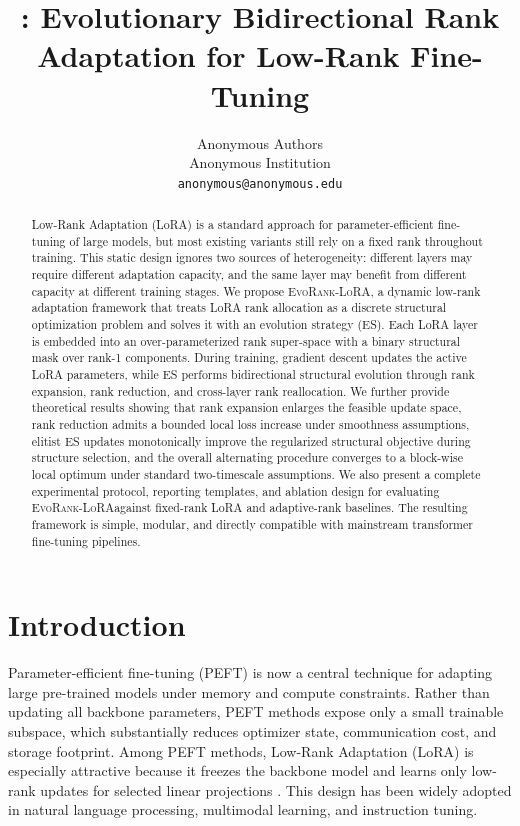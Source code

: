 \documentclass{article}
\title{\method: Evolutionary Bidirectional Rank Adaptation for Low-Rank Fine-Tuning}
\author{%
  Anonymous Authors \\
  Anonymous Institution \\
  \texttt{anonymous@anonymous.edu}
}
\newcommand{\method}{\textsc{EvoRank-LoRA}}
\begin{document}
\maketitle

\begin{abstract}
Low-Rank Adaptation (LoRA) is a standard approach for parameter-efficient fine-tuning of large models, but most existing variants still rely on a fixed rank throughout training. This static design ignores two sources of heterogeneity: different layers may require different adaptation capacity, and the same layer may benefit from different capacity at different training stages. We propose \method, a dynamic low-rank adaptation framework that treats LoRA rank allocation as a discrete structural optimization problem and solves it with an evolution strategy (ES). Each LoRA layer is embedded into an over-parameterized rank super-space with a binary structural mask over rank-1 components. During training, gradient descent updates the active LoRA parameters, while ES performs bidirectional structural evolution through rank expansion, rank reduction, and cross-layer rank reallocation. We further provide theoretical results showing that rank expansion enlarges the feasible update space, rank reduction admits a bounded local loss increase under smoothness assumptions, elitist ES updates monotonically improve the regularized structural objective during structure selection, and the overall alternating procedure converges to a block-wise local optimum under standard two-timescale assumptions. We also present a complete experimental protocol, reporting templates, and ablation design for evaluating \method against fixed-rank LoRA and adaptive-rank baselines. The resulting framework is simple, modular, and directly compatible with mainstream transformer fine-tuning pipelines.
\end{abstract}

\section{Introduction}
Parameter-efficient fine-tuning (PEFT) is now a central technique for adapting large pre-trained models under memory and compute constraints. Rather than updating all backbone parameters, PEFT methods expose only a small trainable subspace, which substantially reduces optimizer state, communication cost, and storage footprint. Among PEFT methods, Low-Rank Adaptation (LoRA) is especially attractive because it freezes the backbone model and learns only low-rank updates for selected linear projections \citep{hu2022lora}. This design has been widely adopted in natural language processing, multimodal learning, and instruction tuning.
\end{document}
